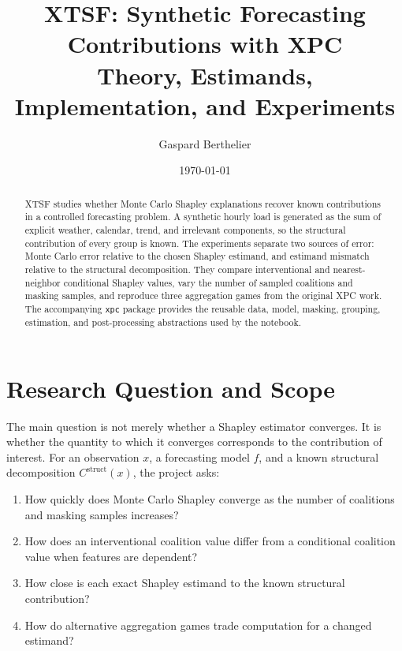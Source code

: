 \documentclass[11pt]{article}
\title{XTSF: Synthetic Forecasting Contributions with XPC\\
Theory, Estimands, Implementation, and Experiments}
\author{Gaspard Berthelier}
\date{\today}
\newcommand{\code}[1]{\texttt{#1}}
\begin{document}
\maketitle

\begin{abstract}
XTSF studies whether Monte Carlo Shapley explanations recover known
contributions in a controlled forecasting problem.  A synthetic hourly load is
generated as the sum of explicit weather, calendar, trend, and irrelevant
components, so the structural contribution of every group is known.  The
experiments separate two sources of error: Monte Carlo error relative to the
chosen Shapley estimand, and estimand mismatch relative to the structural
decomposition.  They compare interventional and nearest-neighbor conditional
Shapley values, vary the number of sampled coalitions and masking samples, and
reproduce three aggregation games from the original XPC work.  The accompanying
\code{xpc} package provides the reusable data, model, masking, grouping,
estimation, and post-processing abstractions used by the notebook.
\end{abstract}

\setcounter{tocdepth}{1}
\tableofcontents
\clearpage

\section{Research Question and Scope}

The main question is not merely whether a Shapley estimator converges.  It is
whether the quantity to which it converges corresponds to the contribution of
interest.  For an observation \(x\), a forecasting model \(f\), and a known
structural decomposition \(C^{\mathrm{struct}}(x)\), the project asks:

\begin{enumerate}
  \item How quickly does Monte Carlo Shapley converge as the number of
        coalitions and masking samples increases?
  \item How does an interventional coalition value differ from a conditional
        coalition value when features are dependent?
  \item How close is each exact Shapley estimand to the known structural
        contribution?
  \item How do alternative aggregation games trade computation for a changed
        estimand?
\end{enumerate}
\end{document}
